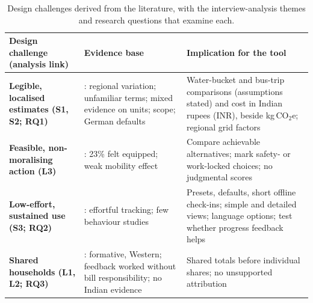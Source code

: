 \documentclass[10pt,a4paper,twocolumn]{article}
\begin{document}
\begin{table}[t]
\centering
\footnotesize
\setlength{\tabcolsep}{4pt}
\caption{Design challenges derived from the literature, with the interview-analysis themes and research questions that examine each.}
\label{tab:challenges}
\begin{tabularx}{\textwidth}{>{\bfseries}p{4.3cm} p{5.6cm} X}
\toprule
\textbf{Design challenge (analysis link)} & \textbf{Evidence base} & \textbf{Implication for the tool}\\
\midrule
Legible, localised estimates (S1, S2; RQ1) & \cite{lee2021,gandhi2025,grinstein2018,mohanty2023,shi2021,koide2019,hoffmann2024}: regional variation; unfamiliar terms; mixed evidence on units; scope; German defaults & Water-bucket and bus-trip comparisons (assumptions stated) and cost in Indian rupees (INR), beside kg\,CO$_2$e; regional grid factors\\
Feasible, non-moralising action (L3) & \cite{collins2020,hoffmann2024,brynjarsdottir2012}: 23\% felt equipped; weak mobility effect & Compare achievable alternatives; mark safety- or work-locked choices; no judgmental scores\\
Low-effort, sustained use (S3; RQ2) & \cite{hoffmann2024,froehlich2010,kok2021}: effortful tracking; few behaviour studies & Presets, defaults, short offline check-ins; simple and detailed views; language options; test whether progress feedback helps\\
Shared households (L1, L2; RQ3) & \cite{froehlich2012,tiefenbeck2019}: formative, Western; feedback worked without bill responsibility; no Indian evidence & Shared totals before individual shares; no unsupported attribution\\
\bottomrule
\end{tabularx}
\end{table}
\end{document}
